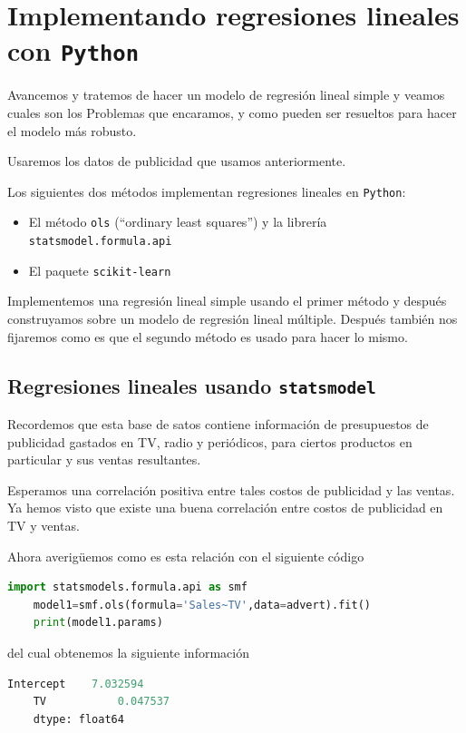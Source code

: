 \section{Implementando regresiones lineales con \texttt{Python}}

Avancemos y tratemos de hacer un modelo de regresión lineal simple y veamos cuales son los Problemas que encaramos, y como pueden ser resueltos para hacer el modelo más robusto.



Usaremos los datos de publicidad que usamos anteriormente.


Los siguientes dos métodos implementan regresiones lineales en \texttt{Python}:
\begin{itemize}
	\item El método \texttt{ols} (``ordinary least squares'') y la librería \texttt{statsmodel.formula.api}
	\item El paquete \texttt{scikit-learn}
\end{itemize}
Implementemos una regresión lineal simple usando el primer método y después construyamos sobre un modelo de regresión lineal múltiple. Después también nos fijaremos como es que el segundo método es usado para hacer lo mismo.

\subsection{Regresiones lineales usando \texttt{statsmodel}}




Recordemos que esta base de satos contiene información de presupuestos de publicidad gastados en TV, radio y periódicos, para ciertos productos en particular y sus ventas resultantes.


Esperamos una correlación positiva entre tales costos de publicidad y las ventas. Ya hemos visto que existe una buena correlación entre costos de publicidad en TV y ventas.

Ahora averigüemos como es esta relación con el siguiente código
\begin{lstlisting}[language=Python]
	import statsmodels.formula.api as smf
	model1=smf.ols(formula='Sales~TV',data=advert).fit()
	print(model1.params)
\end{lstlisting}
del cual obtenemos la siguiente información
\begin{lstlisting}[language=Python]
	Intercept    7.032594
	TV           0.047537
	dtype: float64
\end{lstlisting}



